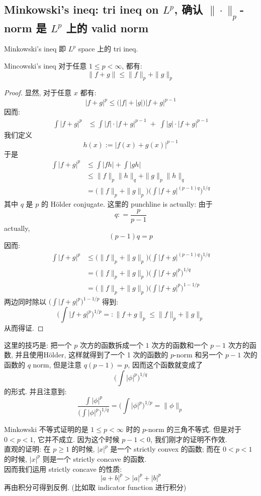 \documentclass[lang=cn,11pt]{elegantbook}
\begin{document}
\subsection{Minkowski's ineq: tri ineq on $L^p$, 确认 $\|\cdot\|_p$-norm 是 $L^p$ 上的 valid norm }
Minkowski's ineq 即 $L^p$ space 上的 tri ineq.
\begin{corollary}{Mincowski's ineq}
对于任意 $1\leq p < \infty$, 都有: \[
\|f +g \| \leq \|f\|_p  + \| g\|_p
\]
\end{corollary}
\begin{proof}
显然, 对于任意 $x$ 都有: \[
    |f + g|^p \leq \bigg( |f| + |g|\bigg) |f+g|^{p-1} 
    \]
    因而: \begin{align*}
           \int |f + g|^p &\leq \int |f| \cdot |f+g|^{p-1} \; + \; \int |g| \cdot |f+g|^{p-1}
    \end{align*}
    我们定义 $$h(x):= |f(x)+g(x)|^{p-1}$$于是 \begin{align*}
          \int  |f + g|^p &\leq \int |fh| + \int |gh| \\
            &\leq \|f\|_p \| h\|_q + \|g\|_p \| h\|_q \\
            &= \bigg(\|f\|_p + \|g\|_p \bigg)  \bigg(\int |f+g|^{(p-1)q}\bigg )^{1/q}
    \end{align*}
其中 $q$ 是 $p$ 的 Hölder conjugate.  这里的 punchline is actually: 由于 \[
q : = \frac{p}{p-1}
\] actually, \[
(p-1)q = p
\]
因而: 
\begin{align*}
        \int  |f + g|^p  &\leq \bigg(\|f\|_p + \|g\|_p \bigg)  \bigg(\int |f+g|^{(p-1)q}\bigg )^{1/q}\\ &= \bigg(\|f\|_p + \|g\|_p \bigg)  \bigg(\int |f+g|^{p}\bigg )^{1/q}\\
        & = \bigg(\|f\|_p + \|g\|_p \bigg)  \bigg(\int |f+g|^{p}\bigg )^{1-1/p}
\end{align*}
两边同时除以 $\big(\int |f+g|^{p}\big )^{1-1/p}$  得到: \[
\bigg(  \int  |f + g|^p \bigg)^{1/p} =: \| f+g\|_p \leq \|f\|_p + \|g\|_p
\]
从而得证.
\end{proof}
\begin{remark}
    这里的技巧是: 把一个 $p$ 次方的函数拆成一个 $1$ 次方的函数和一个 $p-1$ 次方的函数, 并且使用Hölder, 这样就得到了一个 1 次的函数的 $p$-norm 和另一个 $p-1$ 次的函数的 $q$ norm, 但是注意 $q(p-1) = p$, 因而这个函数就变成了 \[
    \bigg( \int |\phi|^p \bigg)^{1/q}
    \]的形式. 并且注意到: \[
    \frac{ \displaystyle \int |\phi|^p }{    \bigg( \displaystyle\int |\phi|^p  \bigg)^{1/q}} = \bigg( \displaystyle\int |\phi|^p  \bigg)^{1/p} = \|\phi\|_p
    \]
\end{remark}
\begin{remark}
    Minkowski 不等式证明的是 \(1\leq p < \infty\) 时的 $p$-norm 的三角不等式. 但是对于 $0<p<1$, 它并不成立. 因为这个时候 $p-1< 0$, 我们刚才的证明不作效.\\
    直观的证明: 在 $p\geq 1$ 的时候, $|x|^p$ 是一个 strictly convex 的函数; 而在 $0< p<1$ 的时候, $|x|^p$ 则是一个 strictly concave 的函数.\\
因而我们运用 strictly concave 的性质: \[
|a+b|^p > |a|^p + |b|^p
\]
再由积分可得到反例. (比如取 indicator function 进行积分)
\end{remark}
\end{document}
